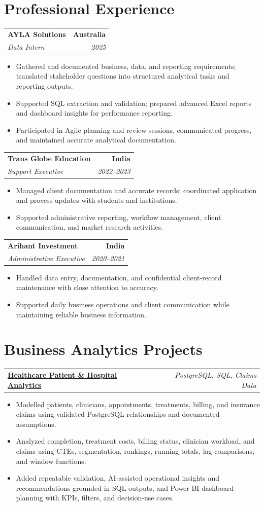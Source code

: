 \documentclass[letterpaper,10pt]{article}
\makeatletter
\newcommand{\role}[4]{%
  \begin{tabularx}{\textwidth}{@{}Xr@{}}
    \textbf{#1} & \textbf{#2} \\
    \textit{#3} & \textit{#4}
  \end{tabularx}\vspace{-1pt}
}
\newcommand{\project}[2]{%
  \begin{tabularx}{\textwidth}{@{}Xr@{}}
    \textbf{#1} & \textit{#2}
  \end{tabularx}\vspace{-1pt}
}
\makeatother
\begin{document}
\section{Professional Experience}
\role{AYLA Solutions}{Australia}{Data Intern}{2025}
\begin{itemize}
  \item Gathered and documented business, data, and reporting requirements; translated stakeholder questions into structured analytical tasks and reporting outputs.
  \item Supported SQL extraction and validation; prepared advanced Excel reports and dashboard insights for performance reporting.
  \item Participated in Agile planning and review sessions, communicated progress, and maintained accurate analytical documentation.
\end{itemize}
\vspace{1pt}

\role{Trans Globe Education}{India}{Support Executive}{2022--2023}
\begin{itemize}
  \item Managed client documentation and accurate records; coordinated application and process updates with students and institutions.
  \item Supported administrative reporting, workflow management, client communication, and market research activities.
\end{itemize}
\vspace{1pt}

\role{Arihant Investment}{India}{Administrative Executive}{2020--2021}
\begin{itemize}
  \item Handled data entry, documentation, and confidential client-record maintenance with close attention to accuracy.
  \item Supported daily business operations and client communication while maintaining reliable business information.
\end{itemize}

\section{Business Analytics Projects}
\project{\href{https://github.com/jainalimehta/Healthcare-Analytics}{Healthcare Patient \& Hospital Analytics}}{PostgreSQL, SQL, Claims Data}
\begin{itemize}
  \item Modelled patients, clinicians, appointments, treatments, billing, and insurance claims using validated PostgreSQL relationships and documented assumptions.
  \item Analyzed completion, treatment costs, billing status, clinician workload, and claims using CTEs, segmentation, rankings, running totals, lag comparisons, and window functions.
  \item Added repeatable validation, AI-assisted operational insights and recommendations grounded in SQL outputs, and Power BI dashboard planning with KPIs, filters, and decision-use cases.
\end{itemize}
\vspace{1pt}
\end{document}
